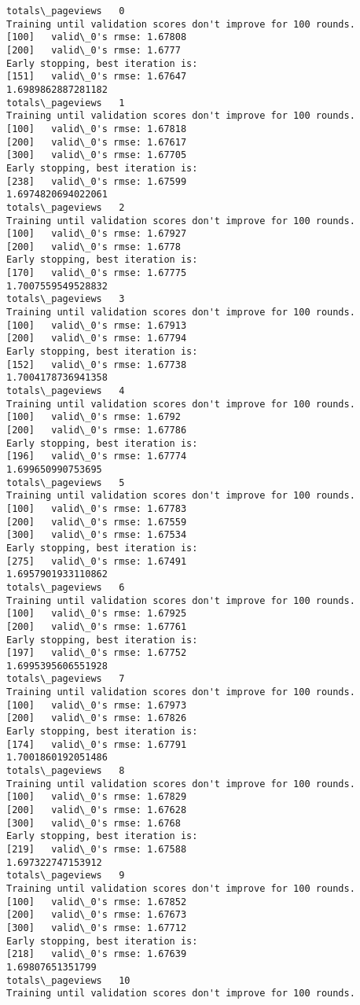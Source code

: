 \documentclass[11pt]{article}
\begin{document}
    \begin{Verbatim}[commandchars=\\\{\}]
totals\_pageviews   0
Training until validation scores don't improve for 100 rounds.
[100]	valid\_0's rmse: 1.67808
[200]	valid\_0's rmse: 1.6777
Early stopping, best iteration is:
[151]	valid\_0's rmse: 1.67647
1.6989862887281182
totals\_pageviews   1
Training until validation scores don't improve for 100 rounds.
[100]	valid\_0's rmse: 1.67818
[200]	valid\_0's rmse: 1.67617
[300]	valid\_0's rmse: 1.67705
Early stopping, best iteration is:
[238]	valid\_0's rmse: 1.67599
1.6974820694022061
totals\_pageviews   2
Training until validation scores don't improve for 100 rounds.
[100]	valid\_0's rmse: 1.67927
[200]	valid\_0's rmse: 1.6778
Early stopping, best iteration is:
[170]	valid\_0's rmse: 1.67775
1.7007559549528832
totals\_pageviews   3
Training until validation scores don't improve for 100 rounds.
[100]	valid\_0's rmse: 1.67913
[200]	valid\_0's rmse: 1.67794
Early stopping, best iteration is:
[152]	valid\_0's rmse: 1.67738
1.7004178736941358
totals\_pageviews   4
Training until validation scores don't improve for 100 rounds.
[100]	valid\_0's rmse: 1.6792
[200]	valid\_0's rmse: 1.67786
Early stopping, best iteration is:
[196]	valid\_0's rmse: 1.67774
1.699650990753695
totals\_pageviews   5
Training until validation scores don't improve for 100 rounds.
[100]	valid\_0's rmse: 1.67783
[200]	valid\_0's rmse: 1.67559
[300]	valid\_0's rmse: 1.67534
Early stopping, best iteration is:
[275]	valid\_0's rmse: 1.67491
1.6957901933110862
totals\_pageviews   6
Training until validation scores don't improve for 100 rounds.
[100]	valid\_0's rmse: 1.67925
[200]	valid\_0's rmse: 1.67761
Early stopping, best iteration is:
[197]	valid\_0's rmse: 1.67752
1.6995395606551928
totals\_pageviews   7
Training until validation scores don't improve for 100 rounds.
[100]	valid\_0's rmse: 1.67973
[200]	valid\_0's rmse: 1.67826
Early stopping, best iteration is:
[174]	valid\_0's rmse: 1.67791
1.7001860192051486
totals\_pageviews   8
Training until validation scores don't improve for 100 rounds.
[100]	valid\_0's rmse: 1.67829
[200]	valid\_0's rmse: 1.67628
[300]	valid\_0's rmse: 1.6768
Early stopping, best iteration is:
[219]	valid\_0's rmse: 1.67588
1.697322747153912
totals\_pageviews   9
Training until validation scores don't improve for 100 rounds.
[100]	valid\_0's rmse: 1.67852
[200]	valid\_0's rmse: 1.67673
[300]	valid\_0's rmse: 1.67712
Early stopping, best iteration is:
[218]	valid\_0's rmse: 1.67639
1.69807651351799
totals\_pageviews   10
Training until validation scores don't improve for 100 rounds.

\end{Verbatim}
\end{document}
